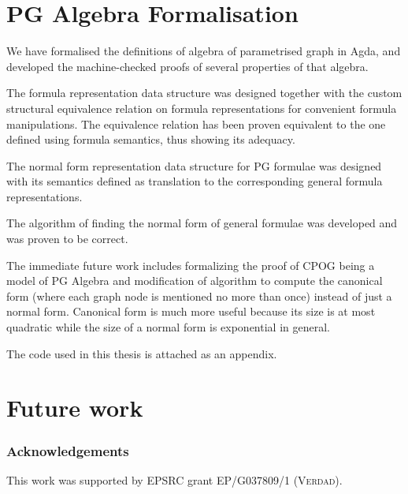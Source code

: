 \section{PG Algebra Formalisation}
We have formalised the definitions of algebra of parametrised graph in Agda, and developed the machine-checked proofs of several properties of that algebra.

The formula representation data structure was designed together with the custom structural equivalence relation on formula representations for convenient formula manipulations. The equivalence relation has been proven equivalent to the one defined using formula semantics, thus showing its adequacy.

The normal form representation data structure for PG formulae was designed with its semantics defined as translation to the corresponding general formula representations.

The algorithm of finding the normal form of general formulae was developed and was proven to be correct.

The immediate future work includes formalizing the proof of CPOG being a model of PG Algebra and modification of algorithm to compute the canonical form (where each graph node is mentioned no more than once) instead of just a normal form. Canonical form is much more useful because its size is at most quadratic while the size of a normal form is exponential in general.

The code used in this thesis is attached as an appendix.

\section{Future work}

\subsubsection*{Acknowledgements}

This work was supported by EPSRC grant EP/G037809/1
(\textsc{Verdad}).
